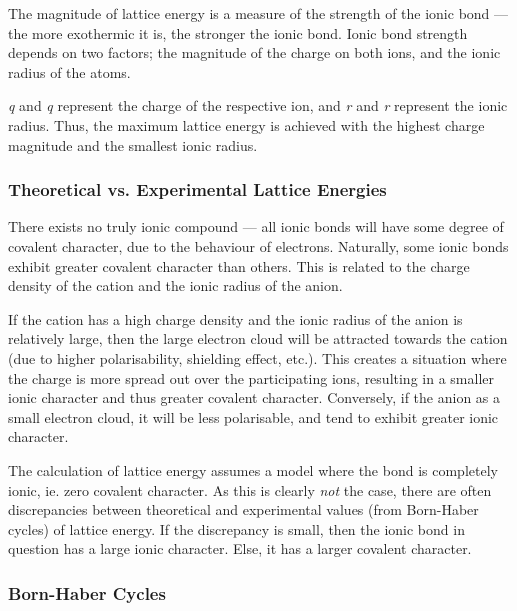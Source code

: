 		The magnitude of lattice energy is a measure of the strength of the ionic bond — the more exothermic it is, the stronger the ionic bond.
		Ionic bond strength depends on two factors; the magnitude of the charge on both ions, and the ionic radius of the atoms.


		\emph{q\sbs{+}} and \emph{q\sbs{-}} represent the charge of the respective ion, and \emph{r\sbs{+}} and \emph{r\sbs{-}} represent
		the ionic radius. Thus, the maximum lattice energy is achieved with the highest charge magnitude and the smallest ionic radius.


		\subsubsection{Theoretical vs. Experimental Lattice Energies}

			There exists no truly ionic compound --- all ionic bonds will have some degree of covalent character, due to the behaviour of
			electrons. Naturally, some ionic bonds exhibit greater covalent character than others. This is related to the charge density
			of the cation and the ionic radius of the anion.

			If the cation has a high charge density and the ionic radius of the anion is relatively large, then the large electron cloud
			will be attracted towards the cation (due to higher polarisability, shielding effect, etc.). This creates a situation where the
			charge is more spread out over the participating ions, resulting in a smaller ionic character and thus greater covalent
			character. Conversely, if the anion as a small electron cloud, it will be less polarisable, and tend to exhibit greater ionic
			character.

			The calculation of lattice energy assumes a model where the bond is completely ionic, ie. zero covalent character. As this is
			clearly \textit{not} the case, there are often discrepancies between theoretical and experimental values (from Born-Haber cycles)
			of lattice energy. If the discrepancy is small, then the ionic bond in question has a large ionic character. Else, it has a
			larger covalent character.


		\subsubsection{Born-Haber Cycles}

